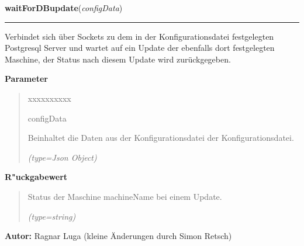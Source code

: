 \hspace{.8\funcindent}\begin{boxedminipage}{\funcwidth}

    \raggedright \textbf{waitForDBupdate}(\textit{configData})

    \vspace{-1.5ex}

    \rule{\textwidth}{0.5\fboxrule}
\setlength{\parskip}{2ex}
    Verbindet sich über Sockets zu dem in der Konfigurationsdatei 
    festgelegten Postgresql Server und wartet auf ein Update der ebenfalls 
    dort festgelegten Maschine, der Status nach diesem Update wird 
    zurückgegeben.

\setlength{\parskip}{1ex}
      \textbf{Parameter}
      \vspace{-1ex}

      \begin{quote}
        \begin{Ventry}{xxxxxxxxxx}

          \item[configData]

          Beinhaltet die Daten aus der Konfigurationsdatei der 
          Konfigurationsdatei.

            {\it (type=Json Object)}

        \end{Ventry}

      \end{quote}

      \textbf{R"uckgabewert}
    \vspace{-1ex}

      \begin{quote}
      Status der Maschine machineName bei einem Update.

      {\it (type=string)}

      \end{quote}

\textbf{Autor:} Ragnar Luga (kleine Änderungen durch Simon Retsch)



    \end{boxedminipage}

    \label{ledleuchtturm:dbFunc:getCurrentDBstate}

    \vspace{0.5ex}

